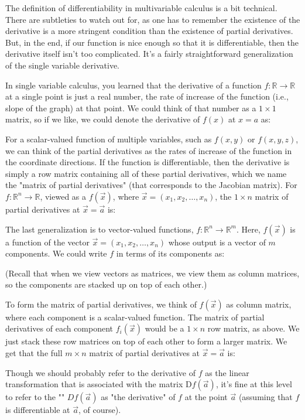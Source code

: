 	The definition of differentiability in multivariable calculus is a bit technical. There are subtleties to watch out for, as one has to remember the existence of the derivative is a more stringent condition than the existence of partial derivatives. But, in the end, if our function is nice enough so that it is differentiable, then the derivative itself isn't too complicated. It's a fairly straightforward generalization of the single variable derivative.
	
	In single variable calculus, you learned that the derivative of a function $f: \mathbb{R} \rightarrow \mathbb{R}$ at a single point is just a real number, the rate of increase of the function (i.e., slope of the graph) at that point. We could think of that number as a $1 \times 1$ matrix, so if we like, we could denote the derivative of $f(x)$ at $x=a$ as:
	
	For a scalar-valued function of multiple variables, such as $f(x, y)$ or $f(x, y, z)$, we can think of the partial derivatives as the rates of increase of the function in the coordinate directions. If the function is differentiable, then the derivative is simply a row matrix containing all of these partial derivatives, which we name the "matrix of partial derivatives" (that corresponds to the Jacobian matrix). For $f: \mathbb{R}^{n} \rightarrow \mathbb{R}$, viewed as a $f(\vec{x})$, where $\vec{x}=\left(x_{1}, x_{2}, \ldots, x_{n}\right)$, the $1 \times n$ matrix of partial derivatives at $\vec{x}=\vec{a}$ is:
	
	The last generalization is to vector-valued functions, $f: \mathbb{R}^{n} \rightarrow \mathbb{R}^{m}$. Here, $f(\vec{x})$ is a function of the vector $\vec{x}=\left(x_{1}, x_{2}, \ldots, x_{n}\right)$ whose output is a vector of $m$ components. We could write $f$ in terms of its components as:
	
	(Recall that when we view vectors as matrices, we view them as column matrices, so the components are stacked up on top of each other.)

	To form the matrix of partial derivatives, we think of $f(\vec{x})$ as column matrix, where each component is a scalar-valued function. The matrix of partial derivatives of each component $f_{i}(\vec{x})$ would be a $1 \times n$ row matrix, as above. We just stack these row matrices on top of each other to form a larger matrix. We get that the full $m \times n$ matrix of partial derivatives at $\vec{x}=\vec{a}$ is:
	
	Though we should probably refer to the derivative of $f$ as the linear transformation that is associated with the matrix $\mathrm{D}f(\vec{a})$, it's fine at this level to refer to the "" $Df(\vec{a})$ as "the derivative" of $f$ at the point $\vec{a}$ (assuming that $f$ is differentiable at $\vec{a}$, of course).
	

